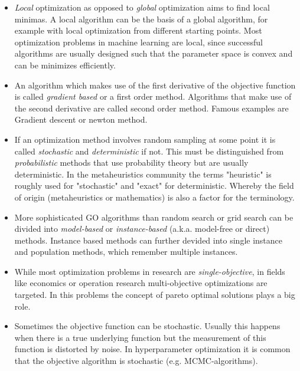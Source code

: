\documentclass[english]{article}
\begin{document}
\begin{itemize}
  \item \textit{Local} optimization as opposed to \textit{global} optimization aims to find local minimas. A local algorithm can be the basis of a global algorithm, for example with local optimization from different starting points. Most optimization problems in machine learning are local, since successful algorithms are usually designed such that the parameter space is convex and can be minimizes efficiently.

  \item An algorithm which makes use of the first derivative of the objective function is called \textit{gradient based} or a first order method. Algorithms that make use of the second derivative are called second order method. Famous examples are Gradient descent or newton method.

  \item If an optimization method involves random sampling at some point it is called \textit{stochastic} and \textit{deterministic} if not. This must be distinguished from \textit{probabilistic} methods that use probability theory but are usually deterministic. In the metaheuristics community the terms "heuristic" is roughly used for "stochastic" and "exact" for deterministic. Whereby the field of origin (metaheuristics or mathematics) is also a factor for the terminology.

  \item More sophisticated GO algorithms than random search or grid search can be divided into \textit{model-based} or \textit{instance-based} (a.k.a. model-free or direct) methods. Instance based methods can further devided into single instance and population methods, which remember multiple instances.

  \item While most optimization problems in research are \textit{single-objective}, in fields like economics or operation research multi-objective optimizations are targeted. In this problems the concept of  pareto optimal solutions plays a big role.

  \item Sometimes the objective function can be stochastic. Usually this happens when there is a true underlying function but the measurement of this function is distorted by noise. In hyperparameter optimization it is common that the objective algorithm is stochastic (e.g. MCMC-algorithms).

\end{itemize}
\end{document}
